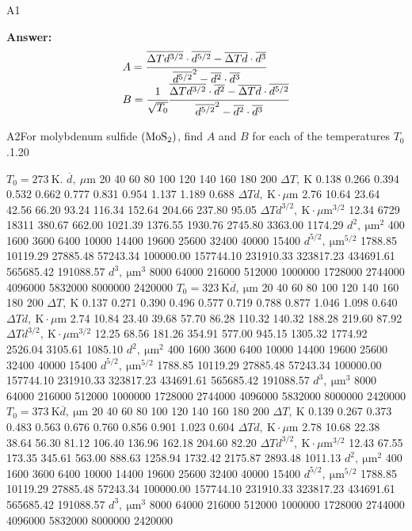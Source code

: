 \documentclass[11pt,a4paper]{article}
\begin{document}
\begin{solcard}{A1}
\par\smallskip\noindent\textbf{Answer:} \[\begin{array}{l}A=\cfrac{\overline{\Delta Td^{3/2}}\cdot\overline{d^{5/2}}-\overline{\Delta Td}\cdot\overline{d^3}}{\overline{d^{5/2}}^2-\overline{d^2}\cdot\overline{d^3}}\\B=\cfrac1{\sqrt{T_0}}\cfrac{\overline{\Delta Td^{3/2}}\cdot\overline{d^2}-\overline{\Delta Td}\cdot\overline{d^{5/2}}}{\overline{d^{5/2}}^2-\overline{d^2}\cdot\overline{d^3}}\end{array}\]
\end{solcard}

\begin{solcard}{A2}{For molybdenum sulfide $\rm(MoS_2)$, find $A$ and $B$ for each of the temperatures $T_0$.}{1.20}

$T_0=273~\mathrm{K}$. $\overline{d},~\mu\text{m}$ 20 40 60 80 100 120 140 160 180 200 $\Delta T,~\mathrm{K}$ 0.138 0.266 0.394 0.532 0.662 0.777 0.831 0.954 1.137 1.189 0.688 $\Delta Td,~\mathrm{K}\cdot\mu\text{m}$ 2.76 10.64 23.64 42.56 66.20 93.24 116.34 152.64 204.66 237.80 95.05 $\Delta Td^{3/2},~\mathrm{K}\cdot\mu\text{m}^{3/2}$ 12.34 6729 18311 380.67 662.00 1021.39 1376.55 1930.76 2745.80 3363.00 1174.29 $d^2,~\mathrm{\mu m}^2$ 400 1600 3600 6400 10000 14400 19600 25600 32400 40000 15400 $d^{5/2},~\mathrm{\mu m}^{5/2}$ 1788.85 10119.29 27885.48 57243.34 100000.00 157744.10 231910.33 323817.23 434691.61 565685.42 191088.57 $d^3,~\mathrm{\mu m}^3$ 8000 64000 216000 512000 1000000 1728000 2744000 4096000 5832000 8000000 2420000 $T_0=323~\mathrm{K}\overline{d},~\mathrm{\mu m}$ 20 40 60 80 100 120 140 160 180 200 $\Delta T,~\mathrm{K}$ 0.137 0.271 0.390 0.496 0.577 0.719 0.788 0.877 1.046 1.098 0.640 $\Delta Td,~\mathrm{K}\cdot\mu\text{m}$ 2.74 10.84 23.40 39.68 57.70 86.28 110.32 140.32 188.28 219.60 87.92 $\Delta Td^{3/2},~\mathrm{K}\cdot\mu\text{m}^{3/2}$ 12.25 68.56 181.26 354.91 577.00 945.15 1305.32 1774.92 2526.04 3105.61 1085.10 $d^2,~\mathrm{\mu m}^2$ 400 1600 3600 6400 10000 14400 19600 25600 32400 40000 15400 $d^{5/2},~\mathrm{\mu m}^{5/2}$ 1788.85 10119.29 27885.48 57243.34 100000.00 157744.10 231910.33 323817.23 434691.61 565685.42 191088.57 $d^3,~\mathrm{\mu m}^3$ 8000 64000 216000 512000 1000000 1728000 2744000 4096000 5832000 8000000 2420000 $T_0=373~\mathrm{K}\overline{d},~\mathrm{\mu m}$ 20 40 60 80 100 120 140 160 180 200 $\Delta T,~\mathrm{K}$ 0.139 0.267 0.373 0.483 0.563 0.676 0.760 0.856 0.901 1.023 0.604 $\Delta Td,~\mathrm{K}\cdot\mu\text{m}$ 2.78 10.68 22.38 38.64 56.30 81.12 106.40 136.96 162.18 204.60 82.20 $\Delta Td^{3/2},~\mathrm{K}\cdot\mu\text{m}^{3/2}$ 12.43 67.55 173.35 345.61 563.00 888.63 1258.94 1732.42 2175.87 2893.48 1011.13 $d^2,~\mathrm{\mu m}^2$ 400 1600 3600 6400 10000 14400 19600 25600 32400 40000 15400 $d^{5/2},~\mathrm{\mu m}^{5/2}$ 1788.85 10119.29 27885.48 57243.34 100000.00 157744.10 231910.33 323817.23 434691.61 565685.42 191088.57 $d^3,~\mathrm{\mu m}^3$ 8000 64000 216000 512000 1000000 1728000 2744000 4096000 5832000 8000000 2420000


\end{solcard}
\end{document}
